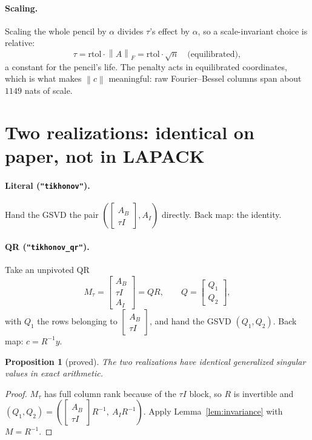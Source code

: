 \documentclass[11pt]{article}
\newtheorem{proposition}{Proposition}
\theoremstyle{definition}
\theoremstyle{remark}
\newcommand{\code}[1]{\texttt{#1}}
\newcommand{\norm}[1]{\left\lVert #1 \right\rVert}
\newcommand{\AB}{A_B}
\newcommand{\AI}{A_I}
\begin{document}
\paragraph{Scaling.} Scaling the whole pencil by $\alpha$ divides $\tau$'s effect by $\alpha$, so a
scale-invariant choice is relative:
\[
  \tau = \mathrm{rtol}\cdot\norm{A}_F = \mathrm{rtol}\cdot\sqrt{n}
  \quad\text{(equilibrated)},
\]
a constant for the pencil's life. The penalty acts in equilibrated coordinates, which is what makes
$\norm{c}$ meaningful: raw Fourier--Bessel columns span about $1149$ nats of scale.

\section{Two realizations: identical on paper, not in LAPACK}

\paragraph{Literal (\code{"tikhonov"}).} Hand the GSVD the pair $\left(\begin{bmatrix}\AB\\ \tau
I\end{bmatrix},\AI\right)$ directly. Back map: the identity.

\paragraph{QR (\code{"tikhonov\_qr"}).} Take an unpivoted QR
\[
  M_\tau = \begin{bmatrix}\AB\\ \tau I\\ \AI\end{bmatrix} = QR,
  \qquad Q = \begin{bmatrix}Q_1\\ Q_2\end{bmatrix},
\]
with $Q_1$ the rows belonging to $\begin{bmatrix}\AB\\ \tau I\end{bmatrix}$, and hand the GSVD
$(Q_1,Q_2)$. Back map: $c = R^{-1}y$.

\begin{proposition}[proved]\label{prop:same}
The two realizations have identical generalized singular values in exact arithmetic.
\end{proposition}
\begin{proof}
$M_\tau$ has full column rank because of the $\tau I$ block, so $R$ is invertible and
$(Q_1,Q_2) = \left(\begin{bmatrix}\AB\\ \tau I\end{bmatrix}R^{-1},\ \AI R^{-1}\right)$. Apply
Lemma~\ref{lem:invariance} with $M = R^{-1}$.
\end{proof}
\end{document}
